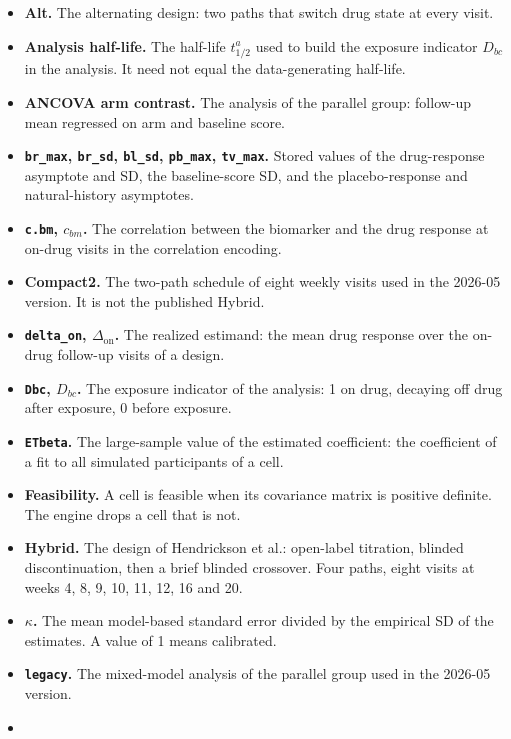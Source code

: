\documentclass[
  11pt,
]{article}
\providecommand{\tightlist}{%
  \setlength{\itemsep}{0pt}\setlength{\parskip}{0pt}}
\begin{document}
\begin{itemize}
\tightlist
\item
  \textbf{Alt.} The alternating design: two paths that switch drug state at every visit.
\item
  \textbf{Analysis half-life.} The half-life \(t^a_{1/2}\) used to build the exposure indicator \(D_{bc}\) in the analysis. It need not equal the data-generating half-life.
\item
  \textbf{ANCOVA arm contrast.} The analysis of the parallel group: follow-up mean regressed on arm and baseline score.
\item
  \textbf{\texttt{br\_max}, \texttt{br\_sd}, \texttt{bl\_sd}, \texttt{pb\_max}, \texttt{tv\_max}.} Stored values of the drug-response asymptote and SD, the baseline-score SD, and the placebo-response and natural-history asymptotes.
\item
  \textbf{\texttt{c.bm}, \(c_{bm}\).} The correlation between the biomarker and the drug response at on-drug visits in the correlation encoding.
\item
  \textbf{Compact2.} The two-path schedule of eight weekly visits used in the 2026-05 version. It is not the published Hybrid.
\item
  \textbf{\texttt{delta\_on}, \(\Delta_{\mathrm{on}}\).} The realized estimand: the mean drug response over the on-drug follow-up visits of a design.
\item
  \textbf{\texttt{Dbc}, \(D_{bc}\).} The exposure indicator of the analysis: 1 on drug, decaying off drug after exposure, 0 before exposure.
\item
  \textbf{\texttt{ETbeta}.} The large-sample value of the estimated coefficient: the coefficient of a fit to all simulated participants of a cell.
\item
  \textbf{Feasibility.} A cell is feasible when its covariance matrix is positive definite. The engine drops a cell that is not.
\item
  \textbf{Hybrid.} The design of Hendrickson et al.: open-label titration, blinded discontinuation, then a brief blinded crossover. Four paths, eight visits at weeks 4, 8, 9, 10, 11, 12, 16 and 20.
\item
  \textbf{\(\kappa\).} The mean model-based standard error divided by the empirical SD of the estimates. A value of 1 means calibrated.
\item
  \textbf{\texttt{legacy}.} The mixed-model analysis of the parallel group used in the 2026-05 version.
\item

\end{itemize}
\end{document}
